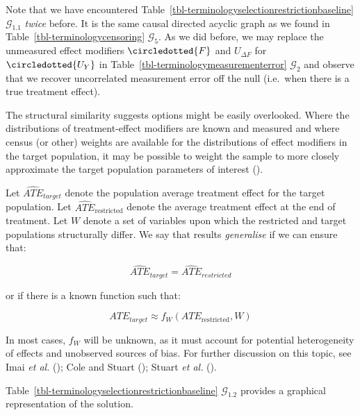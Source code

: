 \documentclass[
  single column]{article}
\begin{document}
Note that we have encountered
Table~\ref{tbl-terminologyselectionrestrictionbaseline}
\(\mathcal{G}_{1.1}\) \emph{twice} before. It is the same causal
directed acyclic graph as we found in
Table~\ref{tbl-terminologycensoring} \(\mathcal{G}_5\). As we did
before, we may replace the unmeasured effect modifiers
\(\circledotted{F}\) and \(U_{\Delta F}\) for \(\circledotted{U_Y}\) in
Table~\ref{tbl-terminologymeasurementerror} \(\mathcal{G}_2\) and
observe that we recover uncorrelated measurement error off the null
(i.e.~when there is a true treatment effect).

The structural similarity suggests options might be easily overlooked.
Where the distributions of treatment-effect modifiers are known and
measured and where census (or other) weights are available for the
distributions of effect modifiers in the target population, it may be
possible to weight the sample to more closely approximate the target
population parameters of interest ().

Let \(\widehat{ATE}_{target}\) denote the population average treatment
effect for the target population. Let
\(\widehat{ATE}_{\text{restricted}}\) denote the average treatment
effect at the end of treatment. Let \(W\) denote a set of variables upon
which the restricted and target populations structurally differ. We say
that results \emph{generalise} if we can ensure that:

\[
\widehat{ATE}_{target} = \widehat{ATE}_{restricted}
\]

or if there is a known function such that:

\[
ATE_{target} \approx f_W(ATE_{\text{restricted}}, W)
\]

In most cases, \(f_W\) will be unknown, as it must account for potential
heterogeneity of effects and unobserved sources of bias. For further
discussion on this topic, see Imai \emph{et al.}
(); Cole and Stuart
(); Stuart \emph{et al.}
().

Table~\ref{tbl-terminologyselectionrestrictionbaseline}
\(\mathcal{G}_{1.2}\) provides a graphical representation of the
solution.
\end{document}
